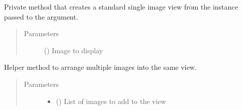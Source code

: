\documentclass[letterpaper,10pt,english]{sphinxmanual}
\begin{document}
\begin{fulllineitems}
\begin{fulllineitems}
\begin{quote}
\begin{description}
\end{description}\end{quote}

\end{fulllineitems}


\begin{fulllineitems}
\label{\detokenize{polo.widgets:polo.widgets.slideshow_viewer.SlideshowViewer._set_single_image_scene}}
Private method that creates a standard single image view from the 
{\hyperref[\detokenize{polo.crystallography:polo.crystallography.image.Image}]{}} instance passed to the  argument.
\begin{quote}\begin{description}
\item[{Parameters}] \leavevmode
{} ({\hyperref[\detokenize{polo.crystallography:polo.crystallography.image.Image}]{}}) \textendash{} Image to display

\end{description}\end{quote}

\end{fulllineitems}


\begin{fulllineitems}
\label{\detokenize{polo.widgets:polo.widgets.slideshow_viewer.SlideshowViewer.arrange_multi_image_scene}}
Helper method to arrange multiple images into the same
view.
\begin{quote}\begin{description}
\item[{Parameters}] \leavevmode\begin{itemize}
\item {} 
 () \textendash{} List of images to add to the view


\end{itemize}
\end{description}
\end{quote}
\end{fulllineitems}
\end{fulllineitems}
\end{document}
